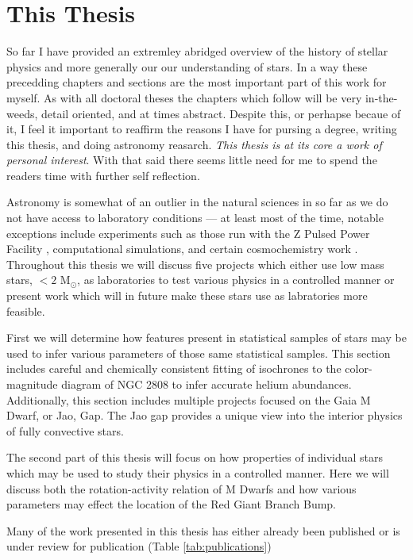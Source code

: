 \section{This Thesis}
So far I have provided an extremley abridged overview of the history of stellar
physics and more generally our our understanding of stars. In a way these precedding
chapters and sections are the most important part of this work for myself. As with all doctoral theses the chapters which 
follow will be very in-the-weeds, detail oriented, and at times abstract. Despite 
this, or perhapse becaue of it, I feel it important to reaffirm the reasons I have
for pursing a degree, writing this thesis, and doing astronomy reasarch. {\em
This thesis is at its core a work of personal interest}. With that said there seems
little need for me to spend the readers time with further self reflection.

Astronomy is somewhat of an outlier in the natural sciences in so far as we do
not have access to laboratory conditions --- at least most of the time, notable
exceptions include experiments such as those run with the Z Pulsed Power
Facility \citep[e.g.][]{Falcon2013}, computational simulations, and certain
cosmochemistry work \citep[e.g.][]{MacPherson2011}. Throughout this thesis we
will discuss five projects which either use low mass stars, $< 2$ M$_{\odot}$, as
laboratories to test various physics in a controlled manner or present work
which will in future make these stars use as labratories more feasible.

First we will determine how features present in statistical samples of stars may be used
to infer various parameters of those same statistical samples. This section
includes careful and chemically consistent fitting of isochrones to the
color-magnitude diagram of NGC 2808 to infer accurate helium abundances.
Additionally, this section includes multiple projects focused on the Gaia M
Dwarf, or Jao, Gap. The Jao gap provides a unique view into the interior
physics of fully convective stars.

The second part of this thesis will focus on how properties of individual stars
which may be used to study their physics in a controlled manner. Here we will
discuss both the rotation-activity relation of M Dwarfs and how various
parameters may effect the location of the Red Giant Branch Bump. 

Many of the work presented in this thesis has either already been published 
or is under review for publication (Table \ref{tab:publications}) 

